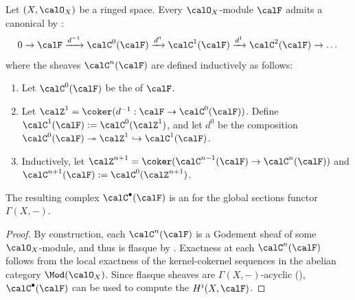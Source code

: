 \begin{theorem} \label{theorem:godement_resolution_of_a_sheaf_of_modules_on_a_ringed_space}
    Let $(X, \calO_X)$ be a ringed space. Every $\calO_X$-module $\calF$ admits a canonical  by :
    $$0 \to \calF \xrightarrow{d^{-1}} \calC^0(\calF) \xrightarrow{d^0} \calC^1(\calF) \xrightarrow{d^1} \calC^2(\calF) \to \dots$$
    where the sheaves $\calC^n(\calF)$ are defined inductively as follows:
    \begin{enumerate}
        \item Let $\calC^0(\calF)$ be the  of $\calF$.
        \item Let $\calZ^1 = \coker(d^{-1}: \calF \to \calC^0(\calF))$. Define $\calC^1(\calF) := \calC^0(\calZ^1)$, and let $d^0$ be the composition $\calC^0(\calF) \twoheadrightarrow \calZ^1 \hookrightarrow \calC^1(\calF)$.
        \item Inductively, let $\calZ^{n+1} = \coker(\calC^{n-1}(\calF) \to \calC^n(\calF))$ and $\calC^{n+1}(\calF) := \calC^0(\calZ^{n+1})$.
    \end{enumerate}
    The resulting complex $\calC^\bullet(\calF)$ is an  for the global sections functor $\Gamma(X, -)$.
\end{theorem}
\begin{proof}
    By construction, each $\calC^n(\calF)$ is a Godement sheaf of some $\calO_X$-module, and thus is flasque by . Exactness at each $\calC^n(\calF)$ follows from the local exactness of the kernel-cokernel sequences in the abelian category $\Mod(\calO_X)$. Since flasque sheaves are $\Gamma(X, -)$-acyclic (), $\calC^\bullet(\calF)$ can be used to compute the  $H^i(X, \calF)$.
\end{proof}